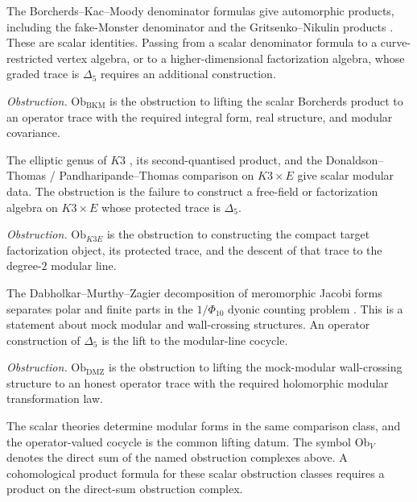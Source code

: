 \begin{constr}\label{app:constr:BKM-obstruction}
The Borcherds--Kac--Moody denominator formulas give automorphic
products, including the fake-Monster denominator and the
Gritsenko--Nikulin products
\cite{borcherds-fake}\cite{gritsenko-nikulin-paramodular}.  These are
scalar identities.  Passing from a scalar denominator formula to a
curve-restricted vertex algebra, or to a higher-dimensional
factorization algebra, whose graded trace is \(\Delta_5\) requires an
additional construction.

\emph{Obstruction.}
\(\mathrm{Ob}_{\mathrm{BKM}}\) is the obstruction to lifting the
scalar Borcherds product to an operator trace with the required
integral form, real structure, and modular covariance.
\end{constr}

\begin{constr}\label{app:constr:K3E-obstruction}
The elliptic genus of \(K3\) \cite{witten-elliptic-genus}, its
second-quantised product, and the Donaldson--Thomas /
Pandharipande--Thomas comparison on
\(K3\times E\) \cite{maulik-pandharipande-thomas} give scalar modular data.
The obstruction is the failure to construct a free-field or
factorization algebra on \(K3\times E\) whose protected trace is
\(\Delta_5\).

\emph{Obstruction.}
\(\mathrm{Ob}_{K3E}\) is the obstruction to constructing the compact
target factorization object, its protected trace, and the descent of
that trace to the degree-\(2\) modular line.
\end{constr}

\begin{constr}\label{app:constr:DMZ-obstruction}
The Dabholkar--Murthy--Zagier decomposition of meromorphic Jacobi
forms separates polar and finite parts in the \(1/\Phi_{10}\)
dyonic counting problem \cite{dabholkar-murthy-zagier}.  This is a
statement about mock modular and wall-crossing structures.  An
operator construction of \(\Delta_5\) is the lift to the modular-line
cocycle.

\emph{Obstruction.}
\(\mathrm{Ob}_{\mathrm{DMZ}}\) is the obstruction to lifting the
mock-modular wall-crossing structure to an honest operator trace with
the required holomorphic modular transformation law.
\end{constr}

\begin{rmk}\label{app:rmk:operator-lift-obstructions}
The scalar theories determine modular forms in the same comparison
class, and the operator-valued cocycle is the common lifting datum.  The symbol
\(\mathrm{Ob}_V\) denotes the direct sum of the named
obstruction complexes above.  A cohomological product formula for these
scalar obstruction classes requires a product on the direct-sum
obstruction complex.
\end{rmk}

